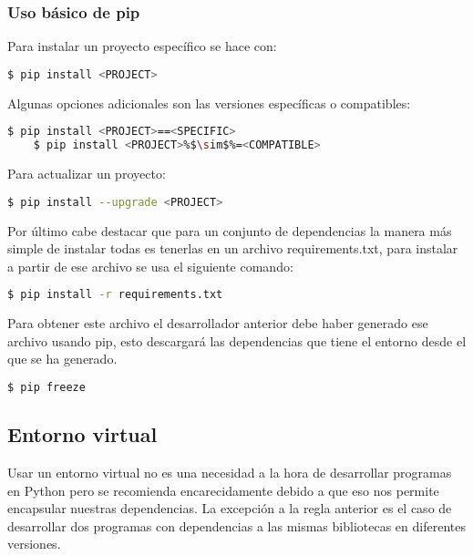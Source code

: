 \subsubsection{Uso básico de pip}

Para instalar un proyecto específico se hace con:

\begin{lstlisting}[language=bash]
    $ pip install <PROJECT>
\end{lstlisting}

Algunas opciones adicionales son las versiones específicas o compatibles:

\begin{lstlisting}[language=bash, escapechar=\%]
    $ pip install <PROJECT>==<SPECIFIC>
    $ pip install <PROJECT>%$\sim$%=<COMPATIBLE>
\end{lstlisting}

Para actualizar un proyecto:

\begin{lstlisting}[language=bash]
    $ pip install --upgrade <PROJECT>
\end{lstlisting}

Por último cabe destacar que para un conjunto de dependencias la manera más simple de instalar todas es tenerlas en un archivo requirements.txt, para instalar a partir de ese archivo se usa el siguiente comando:

\begin{lstlisting}[language=bash]
    $ pip install -r requirements.txt
\end{lstlisting}

Para obtener este archivo el desarrollador anterior debe haber generado ese archivo usando pip, esto descargará las dependencias que tiene el entorno desde el que se ha generado.

\begin{lstlisting}[language=bash]
    $ pip freeze
\end{lstlisting}



\subsection{Entorno virtual}

Usar un entorno virtual no es una necesidad a la hora de desarrollar programas en Python pero se recomienda encarecidamente debido a que eso nos permite encapsular nuestras dependencias. La excepción a la regla anterior es el caso de desarrollar dos programas con dependencias a las mismas bibliotecas en diferentes versiones.

